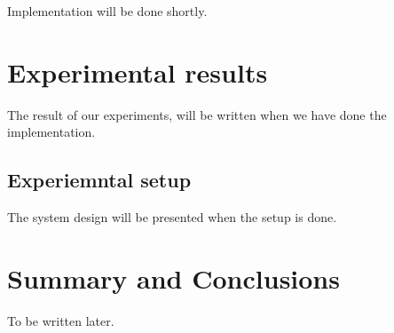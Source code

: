 \documentclass[a4paper,12pt]{article}
\begin{document}
Implementation will be done shortly.

\section{Experimental results}
\label{sec:exps}

The result of our experiments, will be written when we have done the implementation.


\subsection{Experiemntal setup}

The system design will be presented when the setup is done.

\section{Summary and Conclusions}
\label{sec:summary}
To be written later.




\end{document}
